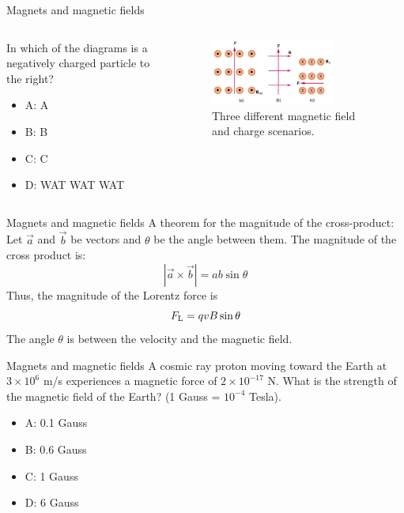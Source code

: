 \documentclass{beamer}
\begin{document}
\begin{frame}{Magnets and magnetic fields}
\begin{columns}[T]
\begin{column}{0.3\textwidth}
In which of the diagrams is a negatively charged particle to the right?
\begin{itemize}
\item A: A
\item B: B
\item C: C
\item D: WAT WAT WAT
\end{itemize}
\end{column}
\begin{column}{0.7\textwidth}
\begin{figure}
\centering
\includegraphics[width=0.75\textwidth]{figures/lorentzProblem.png}
\caption{\label{fig:lorentzProblem5} Three different magnetic field and charge scenarios.}
\end{figure}
\end{column}
\end{columns}
\end{frame}

\begin{frame}{Magnets and magnetic fields}
A theorem for the magnitude of the cross-product:  Let $\vec{a}$ and $\vec{b}$ be vectors and $\theta$ be the angle between them.  The magnitude of the cross product is:
\begin{equation}
|\vec{a} \times \vec{b}| =  a b \sin\theta
\end{equation}
Thus, the magnitude of the Lorentz force is
\begin{equation}
F_{\rm L} = q v B \sin\theta
\end{equation}
The angle $\theta$ is between the velocity and the magnetic field.
\end{frame}

\begin{frame}{Magnets and magnetic fields}
A cosmic ray proton moving toward the Earth at $3 \times 10^{6}$ m/s experiences a magnetic force of $2 \times 10^{-17}$ N. What is the strength of the magnetic field of the Earth? (1 Gauss = $10^{-4}$ Tesla).
\begin{itemize}
\item A: 0.1 Gauss
\item B: 0.6 Gauss
\item C: 1 Gauss
\item D: 6 Gauss
\end{itemize}
\end{frame}
\end{document}
